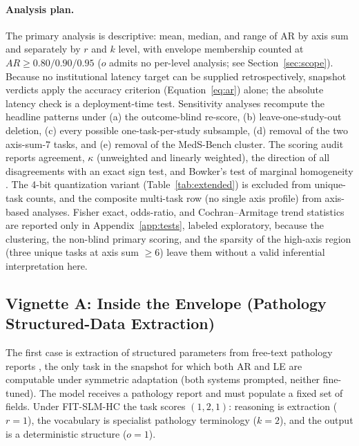 \documentclass[11pt]{article}
\begin{document}
\paragraph{Analysis plan.}
The primary analysis is descriptive: mean, median, and range of AR by axis sum and separately by $r$ and $k$ level, with envelope membership counted at $AR \geq 0.80/0.90/0.95$ ($o$ admits no per-level analysis; see Section~\ref{sec:scope}). Because no institutional latency target can be supplied retrospectively, snapshot verdicts apply the accuracy criterion (Equation~\ref{eq:ar}) alone; the absolute latency check is a deployment-time test. Sensitivity analyses recompute the headline patterns under (a) the outcome-blind re-score, (b) leave-one-study-out deletion, (c) every possible one-task-per-study subsample, (d) removal of the two axis-sum-7 tasks, and (e) removal of the MedS-Bench cluster. The scoring audit reports agreement, $\kappa$ (unweighted and linearly weighted), the direction of all disagreements with an exact sign test, and Bowker's test of marginal homogeneity \cite{Bowker1948}. The 4-bit quantization variant (Table~\ref{tab:extended}) is excluded from unique-task counts, and the composite multi-task row (no single axis profile) from axis-based analyses. Fisher exact, odds-ratio, and Cochran--Armitage trend statistics are reported only in Appendix~\ref{app:tests}, labeled exploratory, because the clustering, the non-blind primary scoring, and the sparsity of the high-axis region (three unique tasks at axis sum $\geq 6$) leave them without a valid inferential interpretation here.

\subsection{Vignette A: Inside the Envelope (Pathology Structured-Data Extraction)}
\label{sec:vignette-a}

The first case is extraction of structured parameters from free-text pathology reports \cite{Grothey2025}, the only task in the snapshot for which both AR and LE are computable under symmetric adaptation (both systems prompted, neither fine-tuned). The model receives a pathology report and must populate a fixed set of fields. Under FIT-SLM-HC the task scores $(1, 2, 1)$: reasoning is extraction ($r=1$), the vocabulary is specialist pathology terminology ($k=2$), and the output is a deterministic structure ($o=1$).
\end{document}
